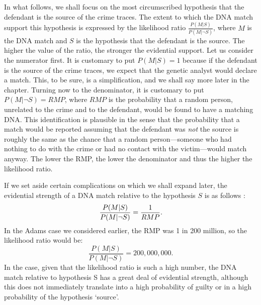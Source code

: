 \documentclass[10pt]{article}
\begin{document}
In what follows, we shall focus on the most circumscribed hypothesis that the defendant is the source of the crime traces. 
The extent to which the DNA match support this hypothesis is expressed by the likelihood ratio 
$\frac{P(M | S)}{P( M | \neg S)}$, where $M$ is the DNA match and $S$ is the hypothesis that the defendant is the source. 
The higher the value of the ratio, the stronger the evidential support. 
Let us consider the numerator first. It is customary to put $P(M | S)=1$ because if the defendant is the source of the crime traces, we expect that the genetic analyst would declare a match. This, to be sure, is a simplification, and we shall say more later in the chapter. Turning now to the denominator, it is customary to put $P(M | \neg S)=RMP$, where $RMP$ is the probability that a random person, unrelated to the crime and to the defendant, would be found to have a matching DNA.  This identification is plausible in the sense that the probability that a match would be reported assuming that the defendant was \textit{not} the source is roughly the same as the chance that a random person---someone who had nothing to do with the crime or had no contact with the victim---would match anyway.  The lower the RMP, the lower the denominator and thus the higher the likelihood ratio.  


If we set aside certain complications on which we shall expand later, the evidential strength 
 of a DNA  match relative to the hypothesis $S$ is as follows \citep{Dawid02, Balding2005Weight}:
%
\[
{P(M | S) \over P(M | \neg S)} =   {1 \over RMP}.
\]
%
In the Adams case we considered earlier, the RMP was 1 in 200 million, so the likelihood ratio would be:
%
\[\frac{P(M |S)}{P( M | \neg S )}=200,000,000.\]
%
In the case, given that the likelihood ratio is such a high number, the DNA match relative to 
hypothesis S has a great deal of evidential strength, although this does not immediately translate into a high probability of guilty 
or in a high probability of the hypothesis `source'. 
\end{document}
